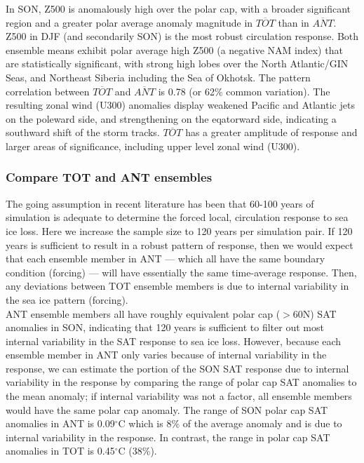\documentclass[twocol]{ametsoc}
\begin{document}
In SON, Z500 is anomalously high over the polar cap, with a broader significant region and a greater polar average anomaly magnitude in $\overline{TOT}$ than in $\overline{ANT}$. \\

Z500 in DJF (and secondarily SON) is the most robust circulation response. Both ensemble means exhibit polar average high Z500 (a negative NAM index) that are statistically significant, with strong high lobes over the North Atlantic/GIN Seas, and Northeast Siberia including the Sea of Okhotsk. The pattern correlation between $\overline{TOT}$ and $\overline{ANT}$ is 0.78 (or 62\% common variation). The resulting zonal wind (U300) anomalies display weakened Pacific and Atlantic jets on the poleward side, and strengthening on the eqatorward side, indicating a southward shift of the storm tracks. $\overline{TOT}$ has a greater amplitude of response and larger areas of significance, including upper level zonal wind (U300).\\ 

\subsubsection{Compare TOT and ANT ensembles}
The going assumption in recent literature has been that 60-100 years of simulation is adequate to determine the forced local, circulation response to sea ice loss. Here we increase the sample size to 120 years per simulation pair. If 120 years is sufficient to result in a robust pattern of response, then we would expect that each ensemble member in ANT --- which all have the same boundary condition (forcing) --- will have essentially the same time-average response. Then, any deviations between TOT ensemble members is due to internal variability in the sea ice pattern (forcing).\\

ANT ensemble members all have roughly equivalent polar cap ($>$60N) SAT anomalies in SON, indicating that 120 years is sufficient to filter out most internal variability in the SAT response to sea ice loss. However, because each ensemble member in ANT only varies because of internal variability in the response, we can estimate the portion of the SON SAT response due to internal variability in the response by comparing the range of polar cap SAT anomalies to the mean anomaly; if internal variability was not a factor, all ensemble members would have the same polar cap anomaly. The range of SON polar cap SAT anomalies in ANT is 0.09$^\circ$C which is 8\% of the average anomaly and is due to internal variability in the response. In contrast, the range in polar cap SAT anomalies in TOT is 0.45$^\circ$C (38\%).\\
\end{document}
